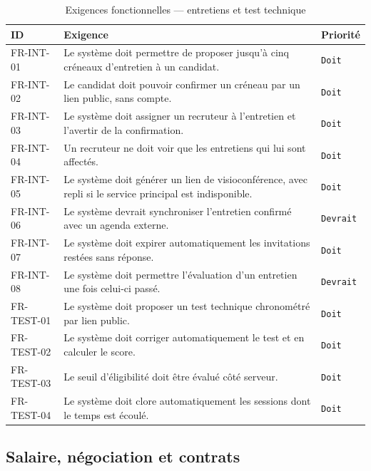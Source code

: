 \begin{table}[htbp]
  \centering
  \caption{Exigences fonctionnelles — entretiens et test technique}
  \label{tab:fr_interviews}
  \begin{tabularx}{\textwidth}{L{2.4cm} X L{1.9cm}}
    \toprule
    \textbf{ID} & \textbf{Exigence} & \textbf{Priorité} \\
    \midrule
    FR-INT-01  & Le système doit permettre de proposer jusqu'à cinq créneaux d'entretien à un candidat. & \texttt{Doit} \\
    FR-INT-02  & Le candidat doit pouvoir confirmer un créneau par un lien public, sans compte. & \texttt{Doit} \\
    FR-INT-03  & Le système doit assigner un recruteur à l'entretien et l'avertir de la confirmation. & \texttt{Doit} \\
    FR-INT-04  & Un recruteur ne doit voir que les entretiens qui lui sont affectés. & \texttt{Doit} \\
    FR-INT-05  & Le système doit générer un lien de visioconférence, avec repli si le service principal est indisponible. & \texttt{Doit} \\
    FR-INT-06  & Le système devrait synchroniser l'entretien confirmé avec un agenda externe. & \texttt{Devrait} \\
    FR-INT-07  & Le système doit expirer automatiquement les invitations restées sans réponse. & \texttt{Doit} \\
    FR-INT-08  & Le système doit permettre l'évaluation d'un entretien une fois celui-ci passé. & \texttt{Devrait} \\
    FR-TEST-01 & Le système doit proposer un test technique chronométré par lien public. & \texttt{Doit} \\
    FR-TEST-02 & Le système doit corriger automatiquement le test et en calculer le score. & \texttt{Doit} \\
    FR-TEST-03 & Le seuil d'éligibilité doit être évalué côté serveur. & \texttt{Doit} \\
    FR-TEST-04 & Le système doit clore automatiquement les sessions dont le temps est écoulé. & \texttt{Doit} \\
    \bottomrule
  \end{tabularx}
\end{table}

\subsection{Salaire, négociation et contrats}
\label{sec:fr_contracts}

